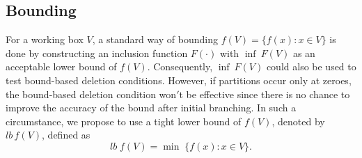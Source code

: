 \documentclass[10pt, letterpaper]{article}
\begin{document}
\subsection{Bounding} 
For a working box $V$, a standard way of bounding \(f(V)=\{f(x): x \in V \}\) is done by constructing an inclusion function \(F(\cdot)\) with \(\inf \>F(V)\) as an acceptable lower bound of \(f(V)\). Consequently, \(\inf \> F(V)\) could also be used to test bound-based deletion conditions. However, if partitions occur only at zeroes, the bound-based deletion condition won$'$t be effective since there is no chance to improve the accuracy of the bound after initial branching. In such a circumstance, we propose to use a tight lower bound of \(f(V)\), denoted by \( lb \, f(V) \), defined as
 \begin{equation*}
     lb\;f(V)=\min\;\{f(x): x \in V\}.
 \end{equation*}
\end{document}
